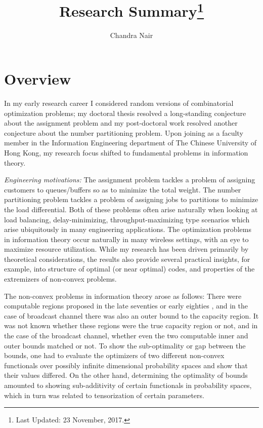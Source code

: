 \documentclass[11pt]{paper} %
\title{Research Summary\thanks{Last Updated: 23 November, 2017.}}
\author{Chandra Nair}
\begin{document}
\maketitle

\section*{Overview}

In my early research career I considered random versions of combinatorial optimization problems;  my doctoral thesis\cite{nai05} resolved a long-standing conjecture about the assignment problem and my post-doctoral work resolved another conjecture about the number partitioning problem\cite{bcmn09a,bcmn09b}. Upon joining as a faculty member in the Information Engineering department of The Chinese University of Hong Kong, my research focus shifted to fundamental problems in  information theory.

{\it Engineering motivations:} The assignment problem tackles a problem of assigning customers to queues/buffers so as to minimize the total weight. The number partitioning problem tackles a problem of assigning jobs to partitions to minimize the load differential. Both of these problems often arise naturally when looking at load balancing, delay-minimizing, throughput-maximizing type scenarios which arise ubiquitously in many engineering applications. The optimization problems in  information theory occur naturally in many wireless settings, with an eye to maximize resource utilization. While my research has been driven primarily by theoretical considerations, the results also provide several practical insights, for example, into structure of optimal (or near optimal) codes, and properties of the extremizers of non-convex problems.


  The non-convex problems in information theory arose as follows: There were computable regions proposed in the late seventies  or early eighties \cite{mar79,hak81}, and in the case of broadcast channel there was also an outer bound to the capacity region\cite{mar79}. It was not known whether these regions were the true capacity region or not, and in the case of the broadcast channel, whether even the two computable inner and outer bounds matched or not. To show the sub-optimality or gap between the bounds, one had to evaluate the optimizers of two different non-convex functionals over possibly infinite dimensional probability spaces and show that their values differed. On the other hand, determining the optimality of bounds amounted to showing sub-additivity of certain functionals\cite{nai13,ggny14} in probability spaces, which in turn was related to tensorization of certain parameters. 
\end{document}
